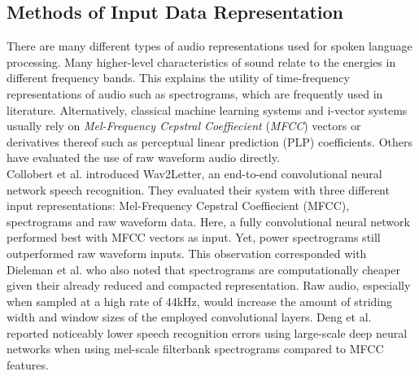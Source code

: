 \subsection{Methods of Input Data Representation}
There are many different types of audio representations used for spoken language processing. Many higher-level characteristics of sound relate to the energies in different frequency bands. This explains the utility of time-frequency representations of audio such as spectrograms, which are frequently used in literature.\cite{montavon2009deep, dieleman2013multiscale, lee2009unsupervised, wulfing2012unsupervised, henaff2011unsupervised} Alternatively, classical machine learning systems and i-vector systems usually rely on \emph{Mel-Frequency Cepstral Coeffiecient} (\emph{MFCC}) vectors\cite{richardson2015unified, dehak2011front, garcia2011analysis} or derivatives thereof such as perceptual linear prediction (PLP) coefficients\cite{gonzalez2014automatic}. Others have evaluated the use of raw waveform audio directly\cite{dieleman2014end, collobert2016wav2letter}.\\
Collobert et al. introduced Wav2Letter, an end-to-end convolutional neural network speech recognition.\cite{collobert2016wav2letter} They evaluated their system with three different input representations: Mel-Frequency Cepstral Coeffiecient (MFCC), spectrograms and raw waveform data. Here, a fully convolutional neural network performed best with MFCC vectors as input. Yet, power spectrograms still outperformed raw waveform inputs. This observation corresponded with Dieleman et al. who also noted that spectrograms are computationally cheaper given their already reduced and compacted representation.\cite{dieleman2014end} Raw audio, especially when sampled at a high rate of 44kHz, would increase the amount of striding width and window sizes of the employed convolutional layers.  
Deng et al. reported noticeably lower speech recognition errors using large-scale deep neural networks when using mel-scale filterbank spectrograms compared to MFCC features.\cite{deng2013recent}


